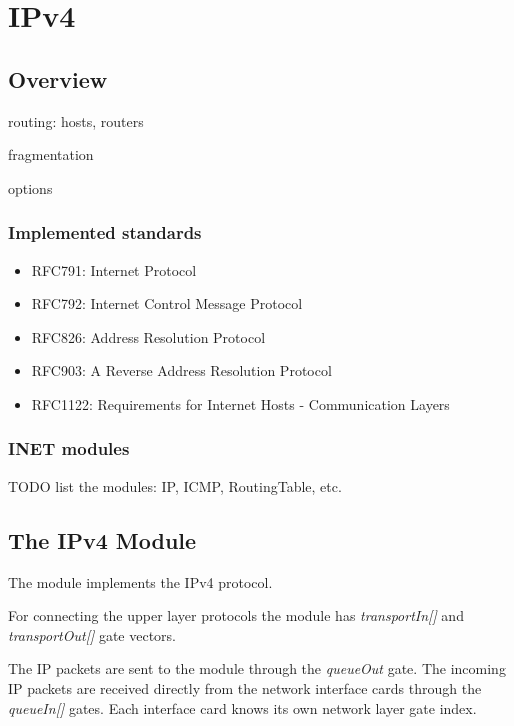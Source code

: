 
\chapter{IPv4}
\label{cha:ipv4}


\section{Overview}

routing: hosts, routers

fragmentation

options

\subsection{Implemented standards}

\begin{itemize}
  \item RFC791: Internet Protocol
  \item RFC792: Internet Control Message Protocol
  \item RFC826: Address Resolution Protocol
  \item RFC903: A Reverse Address Resolution Protocol
  \item RFC1122: Requirements for Internet Hosts - Communication Layers
\end{itemize}


\subsection{INET modules}

TODO list the modules: IP, ICMP, RoutingTable, etc.



\section{The IPv4 Module}

The  module implements the IPv4 protocol.

For connecting the upper layer protocols the  module
has \emph{transportIn[]} and \emph{transportOut[]} gate vectors.

The IP packets are sent to the  module through the
\emph{queueOut} gate. The incoming IP packets are received
directly from the network interface cards through the
\emph{queueIn[]} gates. Each interface card knows its own
network layer gate index.

